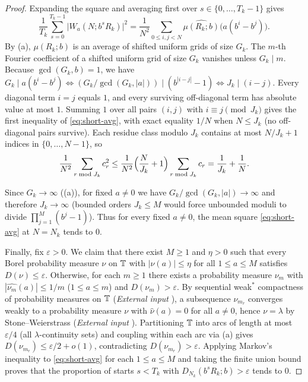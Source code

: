 \documentclass[11pt]{article}
\begin{document}
\begin{proof}
Expanding the square and averaging first over $s\in\{0,\dots,T_k-1\}$ gives
\[
\frac{1}{T_k}\sum_{s=0}^{T_k-1}\bigl|W_a(N;b^sR_k)\bigr|^2
=\frac{1}{N^2}\sum_{0\le i,j<N}\widehat{\mu(R_k;b)}\bigl(a(b^i-b^j)\bigr).
\]
By (a), $\mu(R_k;b)$ is an average of shifted uniform grids of size $G_k$. The $m$-th Fourier coefficient of a shifted uniform grid of size $G_k$ vanishes unless $G_k\mid m$. Because $\gcd(G_k,b)=1$, we have $G_k\mid a(b^i-b^j)\iff (G_k/\gcd(G_k,|a|))\mid(b^{|i-j|}-1)\iff J_k\mid(i-j)$. Every diagonal term $i=j$ equals $1$, and every surviving off-diagonal term has absolute value at most $1$. Summing $1$ over all pairs $(i,j)$ with $i\equiv j\pmod{J_k}$ gives the first inequality of \eqref{eq:short-avg}, with exact equality $1/N$ when $N\le J_k$ (no off-diagonal pairs survive). Each residue class modulo $J_k$ contains at most $N/J_k+1$ indices in $\{0,\dots,N-1\}$, so
\[
\frac{1}{N^2}\sum_{r\bmod J_k}c_r^2\le\frac{1}{N^2}\Bigl(\frac{N}{J_k}+1\Bigr)\sum_{r\bmod J_k}c_r=\frac{1}{J_k}+\frac{1}{N}.
\]

Since $G_k\to\infty$ ((a)), for fixed $a\ne0$ we have $G_k/\gcd(G_k,|a|)\to\infty$ and therefore $J_k\to\infty$ (bounded orders $J_k\le M$ would force unbounded moduli to divide $\prod_{j=1}^M(b^j-1)$). Thus for every fixed $a\ne0$, the mean square \eqref{eq:short-avg} at $N=N_k$ tends to $0$.

Finally, fix $\varepsilon>0$. We claim that there exist $M\ge1$ and $\eta>0$ such that every Borel probability measure $\nu$ on $\mathbb T$ with $|\widehat{\nu}(a)|\le\eta$ for all $1\le a\le M$ satisfies $D(\nu)\le\varepsilon$. Otherwise, for each $m\ge1$ there exists a probability measure $\nu_m$ with $|\widehat{\nu_m}(a)|\le 1/m$ ($1\le a\le m$) and $D(\nu_m)>\varepsilon$. By sequential weak$^*$ compactness of probability measures on $\mathbb T$ (\emph{External input} \cite{Billingsley99}), a subsequence $\nu_{m_r}$ converges weakly to a probability measure $\nu$ with $\widehat{\nu}(a)=0$ for all $a\ne0$, hence $\nu=\lambda$ by Stone--Weierstrass (\emph{External input} \cite{Rudin76}). Partitioning $\mathbb T$ into arcs of length at most $\varepsilon/4$ (all $\lambda$-continuity sets) and coupling within each arc via (a) gives $D(\nu_{m_r})\le\varepsilon/2+o(1)$, contradicting $D(\nu_{m_r})>\varepsilon$. Applying Markov's inequality to \eqref{eq:short-avg} for each $1\le a\le M$ and taking the finite union bound proves that the proportion of starts $s<T_k$ with $D_{N_k}(b^sR_k;b)>\varepsilon$ tends to $0$.
\end{proof}
\end{document}

